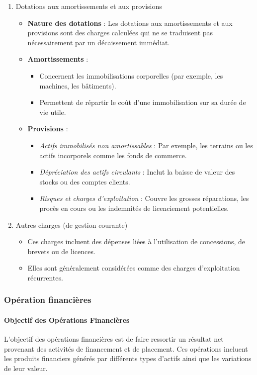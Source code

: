 \documentclass[a4paper, 12pt]{report}
\begin{document}
\begin{enumerate}
\item Dotations aux amortissements et aux provisions
	\begin{itemize}
		\item \textbf{Nature des dotations} : Les dotations aux amortissements et aux provisions sont des charges calculées qui ne se traduisent pas nécessairement par un décaissement immédiat.
		\item \textbf{Amortissements} :
		\begin{itemize}
			\item Concernent les immobilisations corporelles (par exemple, les machines, les bâtiments).
			\item Permettent de répartir le coût d'une immobilisation sur sa durée de vie utile.
		\end{itemize}
		\item \textbf{Provisions} :
		\begin{itemize}
			\item \textit{Actifs immobilisés non amortissables} : Par exemple, les terrains ou les actifs incorporels comme les fonds de commerce.
			\item \textit{Dépréciation des actifs circulants} : Inclut la baisse de valeur des stocks ou des comptes clients.
			\item \textit{Risques et charges d'exploitation} : Couvre les grosses réparations, les procès en cours ou les indemnités de licenciement potentielles.
		\end{itemize}
	\end{itemize}
	
\item Autres charges (de gestion courante)
	\begin{itemize}
		\item Ces charges incluent des dépenses liées à l'utilisation de concessions, de brevets ou de licences.
		\item Elles sont généralement considérées comme des charges d'exploitation récurrentes.
	\end{itemize}
\end{enumerate}

\subsubsection{Opération financières}

\paragraph{Objectif des Opérations Financières}
L'objectif des opérations financières est de faire ressortir un résultat net provenant des activités de financement et de placement. Ces opérations incluent les produits financiers générés par différents types d'actifs ainsi que les variations de leur valeur.
\end{document}
